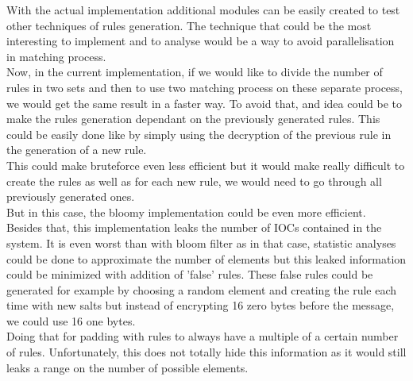 \documentclass{eplmastersthesis}
\begin{document}
With the actual implementation additional modules can be easily created to test other techniques of rules generation. The technique that could be the most interesting to implement and to analyse would be a way to avoid parallelisation in matching process. \\
Now, in the current implementation, if we would like to divide the number of rules in two sets and then to use two matching process on these separate process, we would get the same result in a faster way. To avoid that, and idea could be to make the rules generation dependant on the previously generated rules. This could be easily done like by simply using the decryption of the previous rule in the generation of a new rule.\\
This could make bruteforce even less efficient but it would make really difficult to create the rules as well as for each new rule, we would need to go through all previously generated ones.\\
But in this case, the bloomy implementation could be even more efficient.\\

Besides that, this implementation leaks the number of IOCs contained in the system. It is even worst than with bloom filter as in that case, statistic analyses could be done to approximate the number of elements but this leaked information could be minimized with addition of 'false' rules.  These false rules could be generated for example by choosing a random element and creating the rule each time with new salts but instead of encrypting 16 zero bytes before the message, we could use 16 one bytes.\\
Doing that for padding with rules to always have a multiple of a certain number of rules. Unfortunately, this does not totally hide this information as it would still leaks a range on the number of possible elements.

\end{document}
